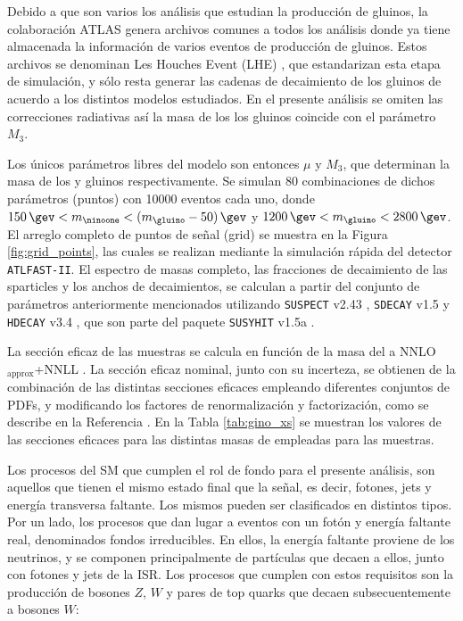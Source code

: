 Debido a que son varios los análisis que estudian la producción de gluinos, la colaboración ATLAS genera archivos comunes a todos los análisis donde ya tiene almacenada la información de varios eventos de producción de gluinos. Estos archivos se denominan Les Houches Event (LHE) \cite{Alwall:2006yp}, que estandarizan esta etapa de simulación, y sólo resta generar las cadenas de decaimiento de los gluinos de acuerdo a los distintos modelos estudiados. En el presente análisis se omiten las correcciones radiativas así la masa de los los gluinos coincide con el parámetro $M_3$.

Los únicos parámetros libres del modelo son entonces $\mu$ y $M_3$, que determinan la masa de los \ninoone y gluinos respectivamente. Se simulan 80 combinaciones de dichos parámetros (puntos) con 10000 eventos cada uno, donde $150\,\gev<m_{\ninoone}<(m_{\gluino}-50)\,\gev$ y $1200\,\gev < m_{\gluino}<2800\,\gev$. El arreglo completo de puntos de señal (grid) se muestra en la Figura \ref{fig:grid_points}, las cuales se realizan mediante la simulación rápida del detector \texttt{ATLFAST-II}. El espectro de masas completo, las fracciones de decaimiento de las sparticles y los anchos de decaimientos, se calculan a partir del conjunto de parámetros anteriormente mencionados utilizando {\texttt{SUSPECT} v2.43} \cite{Djouadi2007426}, {\texttt{SDECAY} v1.5} \cite{Muhlleitner:2004mka} y {\texttt{HDECAY} v3.4} \cite{Djouadi:1997yw}, que son parte del paquete {\texttt{SUSYHIT} v1.5a} \cite{Djouadi:2006bz}.



La sección eficaz de las muestras se calcula en función de la masa del \gluino a 
NNLO$_\text{approx}$+NNLL \cite{Beenakker:1996ch, Kulesza:2008jb, Kulesza:2009kq, Beenakker:2009ha, Beenakker:2011fu}. La sección eficaz nominal, junto con su incerteza, se obtienen de la combinación 
de las distintas secciones eficaces empleando diferentes conjuntos de PDFs, y modificando los factores de renormalización y factorización, como se describe en la Referencia \cite{Borschensky:2014cia}. En la Tabla \ref{tab:gino_xs} se muestran los valores de las secciones eficaces para las distintas masas de \gluino empleadas para las muestras.




Los procesos del SM que cumplen el rol de fondo para el presente análisis, son aquellos que tienen el mismo estado final que la señal, es decir, fotones, jets y energía transversa faltante. Los mismos pueden ser clasificados en distintos tipos. Por un lado, los procesos que dan lugar a eventos con un fotón y energía faltante real, denominados fondos irreducibles. En ellos, la energía faltante proviene de los neutrinos, y se componen principalmente de partículas que decaen a ellos, junto con fotones y jets de la ISR. Los procesos que cumplen con estos requisitos son la producción de bosones $Z$, $W$ y pares de top quarks que decaen subsecuentemente a bosones $W$:


